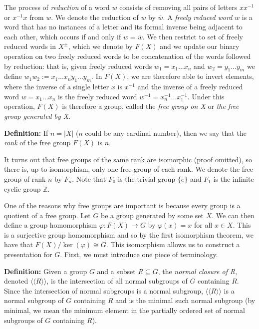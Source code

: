 \documentclass[12pt]{article}
\newcommand{\vs}{\vskip10pt}
\begin{document}
	\vs 
	
	The process of \textit{reduction} of a word $w$ consists of removing all pairs of letters $xx^{-1}$ or $x^{-1}x$ from $w$. We denote the reduction of $w$ by $\overline{w}$. A \textit{freely reduced word} $w$ is a word that has no instances of a letter and its formal inverse being adjacent to each other, which occurs if and only if $w = \overline{w}$. We then restrict to set of freely reduced words in $X^{\pm}$, which we denote by $F(X)$ and we update our binary operation on two freely reduced words to be concatenation of the words followed by reduction: that is, given freely reduced words $w_1 = x_1...x_n$ and $w_2 = y_1...y_m$ we define $w_1 w_2 := \overline{x_1...x_n y_1...y_m}$. In $F(X)$, we are therefore able to invert elements, where the inverse of a single letter $x$ is $x^{-1}$ and the inverse of a freely reduced word $w = x_1 ... x_n$ is the freely reduced word $w^{-1} = x_n^{-1}...x_1^{-1}$. Under this operation, $F(X)$ is therefore a group, called the \textit{free group on X} or \textit{the free group generated by X}. 
	
	\vs 
	
	\textbf{Definition: } If $n = \vert X \vert$ ($n$ could be any cardinal number), then we say that the \textit{rank} of the free group $F(X)$ is $n$. 
	
	\vs
	
	It turns out that free groups of the same rank are isomorphic (proof omitted), so there is, up to isomorphism, only one free group of each rank. We denote the free group of rank $n$ by $F_n$. Note that $F_0$ is the trivial group $\{e\}$ and $F_1$ is the infinite cyclic group $\mathbb{Z}$.
	
	\vs 
	
	One of the reasons why free groups are important is because every group is a quotient of a free group. Let $G$ be a group generated by some set $X$. We can then define a group homomorphism $\varphi: F(X) \rightarrow G$ by $\varphi(x) = x$ for all $x \in X$. This is a surjective group homomorphism and so by the first isomorphism theorem, we have that $F(X) / \ker(\varphi) \cong G$. This isomorphism allows us to construct a presentation for $G$. First, we must introduce one piece of terminology.
	
	\vs 
	
	\textbf{Definition: } Given a group $G$ and a subset $R \subseteq G$, the \textit{normal closure of R}, denoted $\langle \langle R \rangle \rangle$, is the intersection of all normal subgroups of $G$ containing $R$. Since the intersection of normal subgroups is a normal subgroup, $\langle \langle R \rangle \rangle$ is a normal subgroup of $G$ containing $R$ and is the minimal such normal subgroup (by minimal, we mean the minimum element in the partially ordered set of normal subgroups of $G$ containing $R$). 
	
\end{document}
